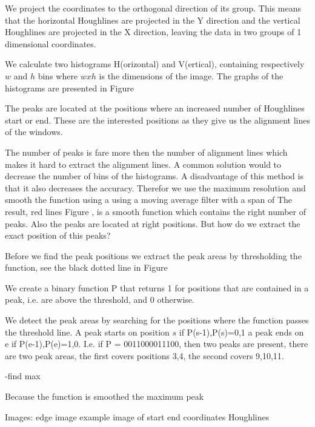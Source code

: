 We project the coordinates to the orthogonal direction of its group. This means
that the horizontal Houghlines are projected in the Y direction and the vertical
Houghlines are projected in the X direction, leaving the data in two groups of 1
dimensional coordinates.

We calculate two histograms H(orizontal) and V(ertical), containing respectively
$w$ and $h$ bins where $w x h$ is the dimensions of the image.  The graphs of
the histograms are presented in Figure %

The peaks are located at the positions where an increased number of Houghlines
start or end.  These are the interested positions as they give us the alignment
lines of the windows. 

The number of peaks is fare more then the number of alignment lines which makes
it hard to extract the alignment lines. A common solution would to decrease the
number of bins of the histograms. A disadvantage of this method is that it also
decreases the accuracy. Therefor we use the maximum resolution and smooth the
function using a using a moving average filter with a span of %
The result, red lines Figure %
, is a smooth function which contains the right number of peaks. Also the peaks
are located at right positions. But how do we extract the exact position of this
peaks?

Before we find the peak positions we extract the peak areas by thresholding the
function, see the black dotted line in Figure %

We create a binary function P that returns 1 for positions that are contained in
a peak, i.e. are above the threshold, and 0 otherwise.

We detect the peak areas by searching for the positions where the function
passes the threshold line. A peak starts on position $s$ if {P(s-1),P(s)}={0,1}
a peak ends on e if {P(e-1),P(e)}={1,0}. I.e. if P = 0011000011100, then two
peaks are present, there are two peak areas, the first covers positions {3,4}, 
the second covers {9,10,11}. 

-find max

Because the function is smoothed the maximum peak 





Images:
edge image
example image of start end coordinates Houghlines



